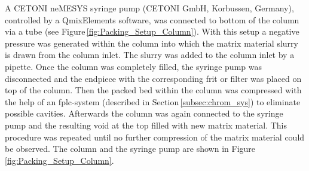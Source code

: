 A CETONI neMESYS syringe pump (CETONI GmbH, Korbussen, Germany), controlled by a QmixElements software, was connected to bottom of the column via a tube (see Figure\,\ref{fig:Packing_Setup_Column}). With this setup a negative pressure was generated within the column into which the matrix material slurry is drawn from the column inlet. The slurry was added to the column inlet by a pipette. Once the column was completely filled, the syringe pump was disconnected and the endpiece with the corresponding frit or filter was placed on top of the column. Then the packed bed within the column was compressed with the help of an \gls{fplc}-system (described in Section\,\ref{subsec:chrom_sys}) to eliminate possible cavities. Afterwards the column was again connected to the syringe pump and the resulting void at the top filled with new matrix material. This procedure was repeated until no further compression of the matrix material could be observed. The column and the syringe pump are shown in Figure\,\ref{fig:Packing_Setup_Column}.

